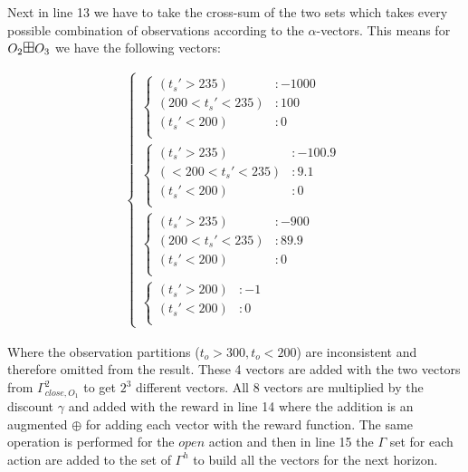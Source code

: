\documentclass{article}
\begin{document}
Next in line 13 we have to take the cross-sum of the two sets which takes every possible combination of observations according to the $\alpha$-vectors. This means for $O_2 \textrm{\large $\boxplus$} O_3$ we have the following vectors: 

\begin{align*}
\begin{cases}
\begin{cases}
(t_s'>235) &: -1000 \\
(200<t_s'<235) &: 100 \\
(t_s'<200) &: 0 \\
\end{cases}
\\
\begin{cases}
(t_s'>235) &: -100.9 \\
(<200<t_s'<235) &: 9.1 \\
(t_s'<200) &: 0 \\
\end{cases}
\\
\begin{cases}
 (t_s'>235) &: -900 \\
 (200<t_s'<235) &: 89.9 \\
 (t_s'<200) &: 0 \\
\end{cases}
\\
\begin{cases}
(t_s'>200) &: -1 \\
(t_s'<200) &: 0 \\
\end{cases}
\end{cases}
\end{align*}

Where the observation partitions ($t_o>300 , t_o<200$) are inconsistent and therefore omitted from the result. These 4 vectors are added with the two vectors from $\Gamma_{close,O_1}^2$ to get $2^3$ different vectors. All 8 vectors are multiplied by the discount $\gamma$ and added with the reward in line 14 where the addition is an augmented $\oplus$ for adding each vector with the reward function. 
The same operation is performed for the $open$ action and then in line 15 the $\Gamma$ set for each action are added to the set of $\Gamma^h$ to build all the vectors for the next horizon. 
\end{document}
